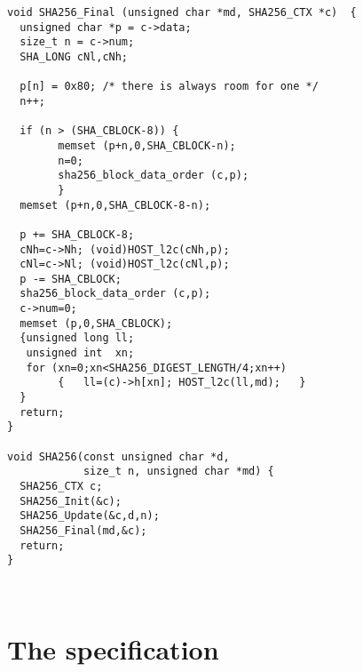 \documentclass[prodmode,acmtoplas]{acmsmall}
\begin{document}
{\begin{verbatim}
void SHA256_Final (unsigned char *md, SHA256_CTX *c)  {
  unsigned char *p = c->data;
  size_t n = c->num;
  SHA_LONG cNl,cNh;

  p[n] = 0x80; /* there is always room for one */
  n++;

  if (n > (SHA_CBLOCK-8)) {
        memset (p+n,0,SHA_CBLOCK-n);
        n=0;
        sha256_block_data_order (c,p);
        }
  memset (p+n,0,SHA_CBLOCK-8-n);

  p += SHA_CBLOCK-8;
  cNh=c->Nh; (void)HOST_l2c(cNh,p);
  cNl=c->Nl; (void)HOST_l2c(cNl,p);
  p -= SHA_CBLOCK;
  sha256_block_data_order (c,p);
  c->num=0;
  memset (p,0,SHA_CBLOCK);
  {unsigned long ll;
   unsigned int  xn;
   for (xn=0;xn<SHA256_DIGEST_LENGTH/4;xn++)    
        {   ll=(c)->h[xn]; HOST_l2c(ll,md);   }
  }
  return;
}

void SHA256(const unsigned char *d, 
            size_t n, unsigned char *md) {
  SHA256_CTX c;
  SHA256_Init(&c);
  SHA256_Update(&c,d,n);
  SHA256_Final(md,&c);
  return;
}



\end{verbatim}}


\section{The specification}
\label{sec:the-spec}
\end{document}
